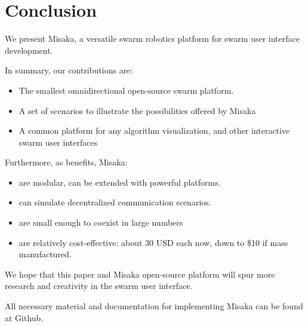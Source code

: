\documentclass[sigconf]{acmart}
\begin{document}
\section{Conclusion}

We present Misaka, a versatile swarm robotics platform for swarm user interface development.

In summary, our contributions are:

\begin{itemize}
    \item The smallest omnidirectional open-source swarm platform.
    \item A set of scenarios to illustrate the possibilities offered by Misaka
    \item A common platform for any algorithm visualization, and other interactive swarm user interfaces
\end{itemize}

Furthermore, as benefits, Misaka:

\begin{itemize}
    \item are modular, can be extended with powerful platforms.
    \item can simulate decentralized communication scenarios.
    \item are small enough to coexist in large numbers
    \item are relatively cost-effective: about 30 USD each now, down to \$10 if mass manufactured.
\end{itemize}

We hope that this paper and Misaka open-source platform will spur more research and creativity in the swarm user interface.

All necessary material and documentation for implementing Misaka can be found at Github.





\end{document}
